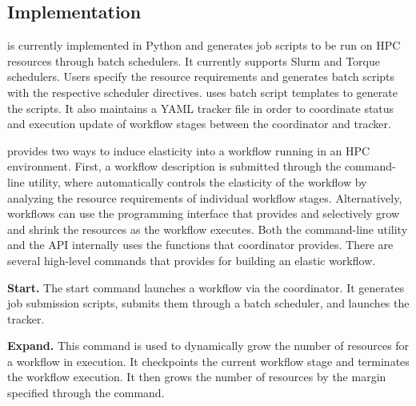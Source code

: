 
\subsection{Implementation}
\systemname is currently implemented in Python and generates job scripts to be
run on HPC resources through batch schedulers. It currently supports Slurm and
Torque schedulers. Users specify the resource requirements and \systemname
generates batch scripts with the respective scheduler directives. \systemname
uses batch script templates to generate the scripts. It also maintains a YAML
tracker file in order to coordinate status and execution update of workflow
stages between the coordinator and tracker.

\systemname provides two ways to induce elasticity into a workflow
running in an HPC environment. First, a workflow
description is submitted through the \systemname command-line utility,
where \systemname automatically controls the elasticity of the workflow
by analyzing the resource requirements of individual workflow stages.
Alternatively, workflows can use the programming interface that \systemname
provides and selectively grow and shrink the resources as the workflow
executes. Both the command-line utility and the API internally uses the
functions that \systemname coordinator provides. There are several high-level
commands that \systemname provides for building an elastic workflow.

\noindent \textbf{Start.} The start command launches a workflow via the
\systemname coordinator. It generates job submission scripts, submits them
through a batch scheduler, and launches the \systemname tracker. 

\noindent \textbf{Expand.} This command is used to dynamically grow the
number of resources for a workflow in execution. It checkpoints the current
workflow stage and terminates the workflow execution. It then grows the
number of resources by the margin specified through the command.  

